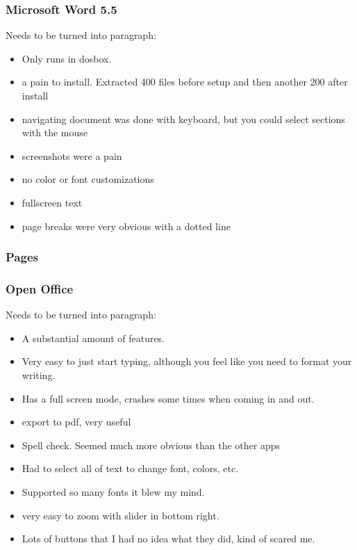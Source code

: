 \documentclass[11pt]{article}
\begin{document}
\subsubsection{Microsoft Word 5.5}

Needs to be turned into paragraph:

\begin{itemize}
\item Only runs in dosbox.
\item a pain to install. Extracted 400 files before setup and then another 200 after install
\item navigating document was done with keyboard, but you could select sections with the mouse
\item screenshots were a pain
\item no color or font customizations
\item fullscreen text
\item page breaks were very obvious with a dotted line
\end{itemize}

\subsubsection{Pages}


\subsubsection{Open Office}

Needs to be turned into paragraph:

\begin{itemize}
\item A substantial amount of features. 
\item Very easy to just start typing, although you feel like you need to format your writing.
\item Has a full screen mode, crashes some times when coming in and out.
\item export to pdf, very useful
\item Spell check. Seemed much more obvious than the other apps
\item Had to select all of text to change font, colors, etc.
\item Supported so many fonts it blew my mind.
\item very easy to zoom with slider in bottom right.
\item Lots of buttons that I had no idea what they did, kind of scared me.
\end{itemize}
\end{document}
